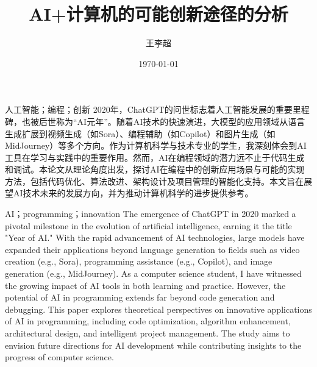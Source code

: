 \documentclass[supercite]{HustGraduPaper}
\title{AI+计算机的可能创新途径的分析} %
\author{王李超} %
\date{\today} %
\begin{document}
	\maketitle[line length=16em]
	
	
	\clearpage %
	
	\begin{cnabstract}{人工智能；编程；创新}
		2020年，ChatGPT的问世标志着人工智能发展的重要里程碑，也被后世称为“AI元年”。随着AI技术的快速演进，大模型的应用领域从语言生成扩展到视频生成（如Sora）、编程辅助（如Copilot）和图片生成（如MidJourney）等多个方向。作为计算机科学与技术专业的学生，我深刻体会到AI工具在学习与实践中的重要作用。然而，AI在编程领域的潜力远不止于代码生成和调试。本论文从理论角度出发，探讨AI在编程中的创新应用场景与可能的实现方法，包括代码优化、算法改进、架构设计及项目管理的智能化支持。本文旨在展望AI技术未来的发展方向，并为推动计算机科学的进步提供参考。
	\end{cnabstract}
	\begin{enabstract}{AI；programming；innovation}
		The emergence of ChatGPT in 2020 marked a pivotal milestone in the evolution of artificial intelligence, earning it the title "Year of AI." With the rapid advancement of AI technologies, large models have expanded their applications beyond language generation to fields such as video creation (e.g., Sora), programming assistance (e.g., Copilot), and image generation (e.g., MidJourney). As a computer science student, I have witnessed the growing impact of AI tools in both learning and practice. However, the potential of AI in programming extends far beyond code generation and debugging. This paper explores theoretical perspectives on innovative applications of AI in programming, including code optimization, algorithm enhancement, architectural design, and intelligent project management. The study aims to envision future directions for AI development while contributing insights to the progress of computer science.
	\end{enabstract}
	
\end{document}
